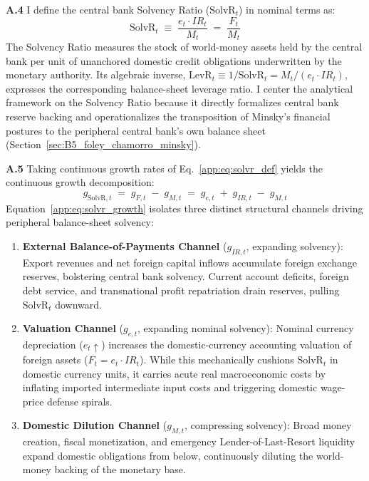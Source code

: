 \textbf{A.4} I define the central bank Solvency Ratio ($\text{SolvR}_t$) in nominal terms as:
\begin{equation}
	\label{app:eq:solvr_def}
	\text{SolvR}_t \;\equiv\; \frac{e_t \cdot IR_t}{M_t} \;=\; \frac{F_t}{M_t}
\end{equation}
The Solvency Ratio measures the stock of world-money assets held by the central bank per unit of unanchored domestic credit obligations underwritten by the monetary authority. Its algebraic inverse, $\text{LevR}_t \equiv 1/\text{SolvR}_t = M_t / (e_t \cdot IR_t)$, expresses the corresponding balance-sheet leverage ratio. I center the analytical framework on the Solvency Ratio because it directly formalizes central bank reserve backing and operationalizes the transposition of Minsky's financial postures to the peripheral central bank's own balance sheet \citep{Foley2003,ChamorroFutinico2025} (Section~\ref{sec:B5_foley_chamorro_minsky}).

\textbf{A.5} Taking continuous growth rates of Eq.~\eqref{app:eq:solvr_def} yields the continuous growth decomposition:
\begin{equation}
	\label{app:eq:solvr_growth}
	g_{\text{SolvR},t} \;=\; g_{F,t} \;-\; g_{M,t} \;=\; g_{e,t} \;+\; g_{IR,t} \;-\; g_{M,t}
\end{equation}
Equation~\eqref{app:eq:solvr_growth} isolates three distinct structural channels driving peripheral balance-sheet solvency:
\begin{enumerate}[leftmargin=2em]
	\item \textbf{External Balance-of-Payments Channel} ($g_{IR,t}$, expanding solvency): Export revenues and net foreign capital inflows accumulate foreign exchange reserves, bolstering central bank solvency. Current account deficits, foreign debt service, and transnational profit repatriation drain reserves, pulling $\text{SolvR}_t$ downward.
	\item \textbf{Valuation Channel} ($g_{e,t}$, expanding nominal solvency): Nominal currency depreciation ($e_t \uparrow$) increases the domestic-currency accounting valuation of foreign assets ($F_t = e_t \cdot IR_t$). While this mechanically cushions $\text{SolvR}_t$ in domestic currency units, it carries acute real macroeconomic costs by inflating imported intermediate input costs and triggering domestic wage-price defense spirals.
	\item \textbf{Domestic Dilution Channel} ($g_{M,t}$, compressing solvency): Broad money creation, fiscal monetization, and emergency Lender-of-Last-Resort liquidity expand domestic obligations from below, continuously diluting the world-money backing of the monetary base.
\end{enumerate}

